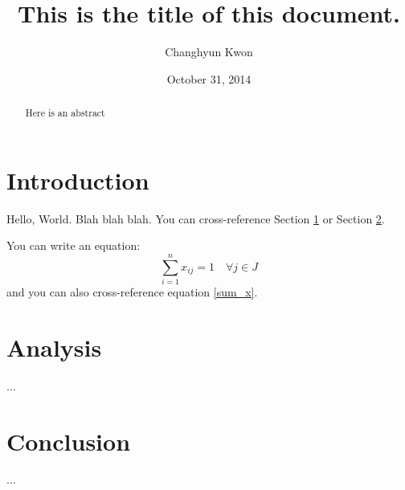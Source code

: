 \documentclass[letterpaper, 11pt]{article}
\title{This is the title of this document.}
\author{Changhyun Kwon}
\date{October 31, 2014}
\begin{document}
\maketitle

\begin{abstract}
Here is an abstract
\end{abstract}


\section{Introduction} \label{sec:intro}

Hello, World. Blah blah blah. You can cross-reference Section \ref{sec:intro} or Section \ref{sec:analysis}.

You can write an equation:
\begin{equation}
\sum_{i=1}^n x_{ij} = 1 \quad \forall j \in J \label{sum_x}
\end{equation}
and you can also cross-reference equation \eqref{sum_x}.


\section{Analysis} \label{sec:analysis}

...

\section{Conclusion} \label{sec:conclusion}

...
\end{document}
